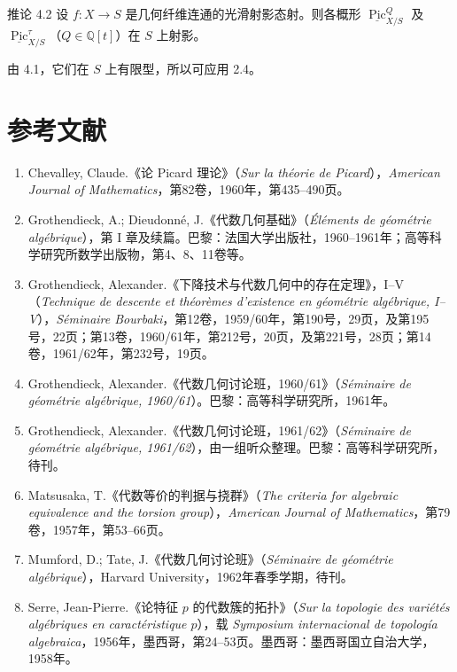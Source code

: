 
\begin{statement}{推论 4.2}
设 $f\colon X\to S$ 是几何纤维连通的光滑射影态射。则各概形 $\underline{\operatorname{Pic}}^Q_{X/S}$ 及 $\underline{\operatorname{Pic}}^\tau_{X/S}$（$Q\in\mathbb Q[t]$）在 $S$ 上射影。
\end{statement}
由 4.1，它们在 $S$ 上有限型，所以可应用 2.4。

\section*{参考文献}
\begin{enumerate}
\item[{[1]}] Chevalley, Claude.《论 Picard 理论》（\emph{Sur la théorie de Picard}），\emph{American Journal of Mathematics}，第82卷，1960年，第435--490页。
\item[{[2]}] Grothendieck, A.; Dieudonné, J.《代数几何基础》（\emph{Éléments de géométrie algébrique}），第 I 章及续篇。巴黎：法国大学出版社，1960--1961年；高等科学研究所数学出版物，第4、8、11卷等。
\item[{[3]}] Grothendieck, Alexander.《下降技术与代数几何中的存在定理》，I--V（\emph{Technique de descente et théorèmes d'existence en géométrie algébrique, I--V}），\emph{Séminaire Bourbaki}，第12卷，1959/60年，第190号，29页，及第195号，22页；第13卷，1960/61年，第212号，20页，及第221号，28页；第14卷，1961/62年，第232号，19页。
\item[{[4]}] Grothendieck, Alexander.《代数几何讨论班，1960/61》（\emph{Séminaire de géométrie algébrique, 1960/61}）。巴黎：高等科学研究所，1961年。
\item[{[5]}] Grothendieck, Alexander.《代数几何讨论班，1961/62》（\emph{Séminaire de géométrie algébrique, 1961/62}），由一组听众整理。巴黎：高等科学研究所，待刊。
\item[{[6]}] Matsusaka, T.《代数等价的判据与挠群》（\emph{The criteria for algebraic equivalence and the torsion group}），\emph{American Journal of Mathematics}，第79卷，1957年，第53--66页。
\item[{[7]}] Mumford, D.; Tate, J.《代数几何讨论班》（\emph{Séminaire de géométrie algébrique}），Harvard University，1962年春季学期，待刊。
\item[{[8]}] Serre, Jean-Pierre.《论特征 $p$ 的代数簇的拓扑》（\emph{Sur la topologie des variétés algébriques en caractéristique $p$}），载 \emph{Symposium internacional de topología algebraica}，1956年，墨西哥，第24--53页。墨西哥：墨西哥国立自治大学，1958年。
\end{enumerate}

